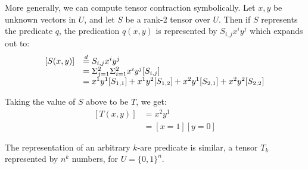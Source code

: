 More generally, we can compute tensor contraction symbolically. Let \(x,y\) be  unknown vectors in \(U\), and let \(S\) be a rank-2 tensor over \(U\). Then if \(S\) represents the predicate \(q\), the predication \(q(x,y)\) is represented by \(S_{i,j}x^i y^j\) which expands out to:
\[\begin{array}{ll}
  [S(x,y)]&\defeq  S_{i,j}x^i y^j\\
  & = \Sigma_{j=1}^2 \Sigma_{i=1}^2 x^i y^j [S_{i,j}] \\
  & =   x^1 y^1  [S_{1,1}] + x^1 y^2 [S_{1,2}]
      + x^2 y^1 [S_{2,1}]  + x^2 y^2 [S_{2,2}]
  \end{array}
\]

\begin{example}
  Taking the value of \(S\) above to be \(T\), we get:
  \[\begin{array}{ll}    
      [T(x,y)] & = x^2y^1\\
      & = [x=1][y=0]
  \end{array}
  \]
\end{example}

The representation of an arbitrary $k$-are predicate is similar, a tensor \(T_k\) represented by \(n^k\) numbers, for \(U=\{0,1\}^n\). 
